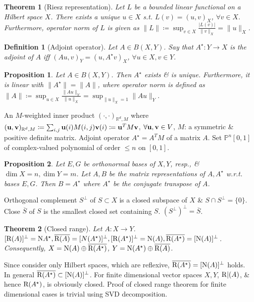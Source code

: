 \documentclass{article}
\newtheorem{definition}{Definition}
\newtheorem{proposition}{Proposition}
\newtheorem{theorem}{Theorem}
\begin{document}
\begin{enumerate}
\begin{itemize}
		\begin{theorem}[Riesz representation]
			Let $L$ be a bounded linear functional on a Hilbert space $X$. There exists a unique $u\in X$ s.t. $L(v) = (u,v)_X$, $\forall v\in X$. Furthermore, operator norm of $L$ is given as $\|L\|\coloneqq\sup_{v\in X} \frac{|L(v)|}{\|v\|_X} = \|u\|_X$.
		\end{theorem}

		\begin{definition}[Adjoint operator]
			Let $A\in B(X,Y)$. Say that $A^\star:Y\to X$ is the adjoint of $A$ iff $(Au,v)_Y = (u,A^\star v)_X$, $\forall u\in X,v\in Y$.
		\end{definition}

		\begin{proposition}
			Let $A\in B(X,Y)$. Then $A^\star$ exists \& is unique. Furthermore, it is linear with $\|A^\star\| = \|A\|$, where operator norm is defined as $\|A\|\coloneqq\sup_{u\in X} \frac{\|Au\|_Y}{\|u\|_X} = \sup_{\|u\|_X = 1} \|Au\|_Y$.
		\end{proposition}
		An $M$-weighted inner product $(\cdot,\cdot)_{\mathbb{R}^d,M}$ where $({\bf u},{\bf v})_{\mathbb{R}^d,M}\coloneqq\sum_{i,j} {\bf u}(i)M(i,j){\bf v}(i)\coloneqq{\bf u}^TM{\bf v}$, $\forall{\bf u},{\bf v}\in V$, $M$: a symmetric \& positive definite matrix. Adjoint operator $A^\star = A^TM$ of a matrix $A$. Set $\mathbb{P}^n[0,1]$ of complex-valued polynomial of order $\le n$ on $[0,1]$.

		\begin{proposition}
			Let $E,G$ be orthonormal bases of $X,Y$, resp., \& $\dim X = n,\dim Y = m$. Let $A,B$ be the matrix representations of $A,A^\star$ w.r.t. bases $E,G$. Then $B = A^\star$ where $A^\star$ be the conjugate transpose of $A$.
		\end{proposition}
		Orthogonal complement $S^\bot$ of $S\subset X$ is a closed subspace of $X$ \& $S\cap S^\bot =\{0\}$. Close $\overline{S}$ of $S$ is the smallest closed set containing $S$. $(S^\bot)^\bot = \overline{S}$.

		\begin{theorem}[Closed range]
			Let $A:X\to Y$. $[{\rm R}(A)]^\bot = {\rm N}{A^\star},\overline{{\rm R}(A)} = [N(A^\star)]^\bot,[{\rm R}(A^\star)]^\bot = {\rm N}(A),\overline{{\rm R}(A^\star)} = [{\rm N}(A)]^\bot$. Consequently, $X = {\rm N}(A)\oplus\overline{{\rm R}(A^\star)}$, $Y = {\rm N}(A^\star)\oplus\overline{{\rm R}(A)}$.
		\end{theorem}
		Since consider only Hilbert spaces, which are reflexive, $\overline{{\rm R}(A^\star)} = [{\rm N}(A)]^\bot$ holds. In general $\overline{{\rm R}(A^\star)}\subset[{\rm N}(A)]^\bot$. For finite dimensional vector spaces $X,Y$, ${\rm R}|(A)$, \& hence ${\rm R}(A^\star)$, is obviously closed. Proof of closed range theorem for finite dimensional cases is trivial using SVD decomposition.


\end{itemize}
\end{enumerate}
\end{document}
